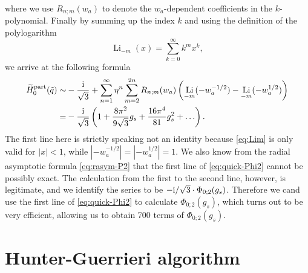 \documentclass[a4paper,11pt]{article}
\theoremstyle{definition}
\newcommand{\ri}{{\rm i}}
\def\tq{{\tilde{q}}}
\newcommand{\wt}[1]{\widetilde{#1}}
\newcommand{\nn}{\nonumber \\}
\DeclareMathOperator{\Li}{Li}
\begin{document}
where we use $R_{n;m}(w_a)$ to denote the $w_a$-dependent coefficients
in the $k$-polynomial.
Finally by summing up the index $k$ and using the definition of
the polylogarithm
%
\begin{equation}
  \Li_{-m}(x) = \sum_{k=0}^\infty k^mx^k,
  \label{eq:Lim}
\end{equation}
%
we arrive at the following formula
%
\begin{align}
  \wt{H}_0^{\text{part}}(\tq) \sim
  &-\frac{\ri}{\sqrt{3}} + \sum_{n=1}^\infty
    \eta^n
    \sum_{m=2}^{2n}R_{n;m}(w_a)\left(\Li_{-m}(-w_a^{-1/2}) -
    \Li_{-m}(-w_a^{1/2})\right)\nn =
  &-\frac{\ri}{\sqrt{3}}\left(
    1+\frac{8\pi^2}{9\sqrt{3}}g_s +
    \frac{16\pi^4}{81}g_s^2+\ldots\right).
    \label{eq:quick-Phi2}
\end{align}
The first line here is strictly speaking not an identity because
\eqref{eq:Lim} is only valid for $|x|<1$, while
$|-w_a^{-1/2}| = |-w_a^{1/2}| = 1$.  We also know from the radial
asymptotic formula \eqref{eq:rasym-P2} that the first line of
\eqref{eq:quick-Phi2} cannot be possibly exact.  The calculation from
the first to the second line, however, is legitimate, and we identify
the series to be $-\ri/\sqrt{3}\cdot\Phi_{0;2}(g_s)$.  Therefore we
cand use the first line of \eqref{eq:quick-Phi2} to calculate
$\Phi_{0;2}(g_s)$, which turns out to be very efficient, allowing us
to obtain 700 terms of $\Phi_{0;2}(g_s)$.

\section{Hunter-Guerrieri algorithm}
\label{sc:hunter}
\end{document}
